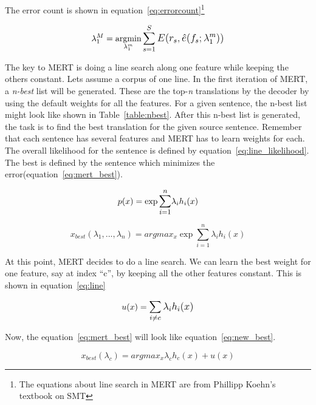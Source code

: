 The error count is shown in equation~\eqref{eq:errorcount}\footnote{The equations about line search in MERT are from Phillipp Koehn's textbook on SMT}

\begin{equation} \label{eq:errorcount}
	\lambda_{1}^{M} = \argmin_{\lambda_{1}^{m}} \mathlarger{\sum\limits_{s=1}^{S}E(r_{s}, \hat{e}(f_{s};\lambda_{1}^{m}))}
\end{equation}

The key to MERT is doing a line search along one feature while keeping the others constant. Lets assume a corpus of one line. In the first iteration of MERT, a \emph{n-best} list will be generated. These are the top-\emph{n} translations by the decoder by using the default weights for all the features. For a given sentence, the n-best list might look like shown in Table~\ref{table:nbest}. After this n-best list is generated, the task is to find the best translation for the given source sentence. Remember that each sentence has several features and MERT has to learn weights for each. The overall likelihood for the sentence is defined by equation~\eqref{eq:line_likelihood}. The best is defined by the sentence which minimizes the error(equation~\eqref{eq:mert_best}). 

\begin{equation} \label{eq:line_likelihood}
	p(x) = \exp\mathlarger{\sum_{i=1}^n}\lambda_{i}h_{i}(x)
\end{equation}

\begin{equation} \label{eq:mert_best}
	x_{best}(\lambda_{1}, ..., \lambda_{n}) = argmax_{x}\exp\sum_{i=1}^n \lambda_{i}h_{i}(x)
\end{equation}

At this point, MERT decides to do a line search. We can learn the best weight for one feature, say at index ``c'', by keeping all the other features constant. This is shown in equation~\eqref{eq:line}


\begin{equation} \label{eq:line}
	u(x) = \mathlarger{\sum_{i \neq c}\lambda_{i}h_{i}(x)}
\end{equation}

Now, the equation~\eqref{eq:mert_best} will look like equation~\eqref{eq:new_best}. 

\begin{equation} \label{eq:new_best}
	x_{best}(\lambda_{c}) = argmax_{x} \lambda_{c}h_{c}(x) + u(x)
\end{equation} 

